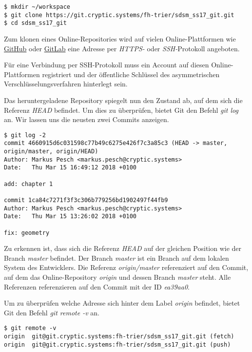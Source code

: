 \begin{verbatim}
$ mkdir ~/workspace
$ git clone https://git.cryptic.systems/fh-trier/sdsm_ss17_git.git
$ cd sdsm_ss17_git
\end{verbatim}

\begin{INFO}
  Zum klonen eines Online-Repositories wird auf vielen Online-Plattformen wie \href{https://github.com}{GitHub} oder \href{https://gitlab.com}{GitLab} eine Adresse per \textit{HTTPS-} oder \textit{SSH-}Protokoll angeboten. 
  
  Für eine Verbindung per SSH-Protokoll muss ein Account auf diesen Online-Plattformen registriert und der öffentliche Schlüssel des asymmetrischen Verschlüsselungsverfahren hinterlegt sein.  
\end{INFO}

Das heruntergeladene Repository spiegelt nun den Zustand ab, auf dem sich die Referenz \textit{HEAD} befindet. Um dies zu überprüfen, bietet Git den Befehl \textit{git log} an. Wir lassen uns die neusten zwei Commits anzeigen.

\begin{verbatim}
$ git log -2
commit 4660915d6c031598c77b49c6275e426f7c3a85c3 (HEAD -> master, 
origin/master, origin/HEAD)
Author: Markus Pesch <markus.pesch@cryptic.systems>
Date:   Thu Mar 15 16:49:12 2018 +0100

add: chapter 1

commit 1ca84c7271f3f3c306b779256bd1902497f44fb9
Author: Markus Pesch <markus.pesch@cryptic.systems>
Date:   Thu Mar 15 13:26:02 2018 +0100

fix: geometry
\end{verbatim}

Zu erkennen ist, dass sich die Referenz \textit{HEAD} auf der gleichen Position wie der Branch \textit{master} befindet. Der Branch \textit{master} ist ein Branch auf dem lokalen System des Entwicklers. Die Referenz \textit{origin/master} referenziert auf den Commit, auf dem das Online-Repository \textit{origin} und dessen Branch \textit{master} steht. Alle Referenzen referenzieren auf den Commit mit der ID \textit{ea39aa0}.

Um zu überprüfen welche Adresse sich hinter dem Label \textit{origin} befindet, bietet Git den Befehl \textit{git remote -v} an.

\begin{verbatim}
$ git remote -v
origin  git@git.cryptic.systems:fh-trier/sdsm_ss17_git.git (fetch)
origin  git@git.cryptic.systems:fh-trier/sdsm_ss17_git.git (push)
\end{verbatim}
 
